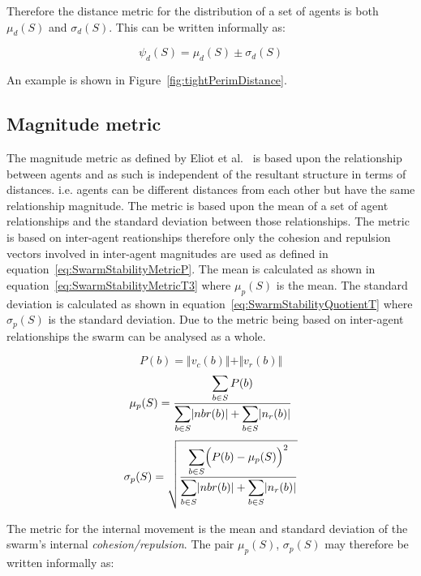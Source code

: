 \documentclass[12pt,a4paper]{IEEEtran}
\newcommand{\magn}[1]{\Vert{#1}\Vert}
\newcommand{\card}[1]{\vert{#1}\vert}
\begin{document}
Therefore the distance metric for the distribution of a set of agents is both $\mu_d(S)$ and $\sigma_d(S)$. This can be written informally as:

\small
\begin{equation}
\label{eq:SwarmPotentialMagnitude}
\psi_d(S) = \mu_d(S)\pm \sigma_d(S)
\end{equation}
\normalsize

An example is shown in Figure~\ref{fig:tightPerimDistance}.

\subsection{Magnitude metric}
The magnitude metric as defined by Eliot et al.~\cite{eliot2018metric} is based upon the relationship between agents and as such is independent of the resultant structure in terms of distances. i.e. agents can be different distances from each other but have the same relationship magnitude.
The metric is based upon the mean of a set of agent relationships and the standard deviation between those relationships. The metric is based on inter-agent reationships therefore only the cohesion and repulsion vectors involved in inter-agent magnitudes are used as defined in equation~\ref{eq:SwarmStabilityMetricP}. The mean is calculated as shown in equation~\ref{eq:SwarmStabilityMetricT3} where $\mu_p(S)$ is the mean. The standard deviation is calculated as shown in equation~\ref{eq:SwarmStabilityQuotientT} where $\sigma_p(S)$ is the standard deviation. Due to the metric being based on inter-agent relationships the swarm can be analysed as a whole.

\small
\begin{equation}\label{eq:SwarmStabilityMetricP}
	P(b) = \magn{v_c(b)} + \magn{v_r(b)}
\end{equation}
\begin{equation}\label{eq:SwarmStabilityMetricT3}
	\mu_p(S) = \frac{\mathlarger{\sum_{b \in S} P(b)}}{\mathlarger{\sum_{b \in S}}\card{nbr(b)} + \mathlarger{\sum_{b \in S}}\card{n_r(b)}}
\end{equation}
\begin{equation}\label{eq:SwarmStabilityQuotientT}
	\sigma_p(S) = \sqrt{\frac{\mathlarger{\sum_{b \in S}}\Big(P(b)-\mu_p(S)\Big)^2}{\mathlarger{\sum_{b \in S}}\card{nbr(b)} + \mathlarger{\sum_{b \in S}}\card{n_r(b)}}}
\end{equation}
\normalsize

The metric for the internal movement is the mean and standard deviation of the swarm's internal \emph{cohesion/repulsion}. The pair $\mu_p(S)$, $\sigma_p(S)$ may therefore be written informally as: 
\end{document}

